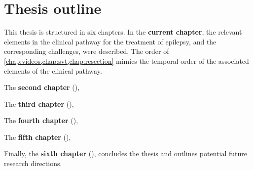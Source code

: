 \section{Thesis outline}

This thesis is structured in six chapters.
In the \textbf{current chapter}, the relevant elements in the clinical pathway for the treatment of epilepsy, and the corresponding challenges, were described.
The order of \cref{chap:videos,chap:svt,chap:resection} mimics the temporal order of the associated elements of the clinical pathway.

The \textbf{second chapter} (),

The \textbf{third chapter} (),

The \textbf{fourth chapter} (),

The \textbf{fifth chapter} (),

Finally, the \textbf{sixth chapter} (), concludes the thesis and outlines potential future research directions.
